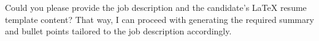 Could you please provide the job description and the candidate's LaTeX resume template content? That way, I can proceed with generating the required summary and bullet points tailored to the job description accordingly.